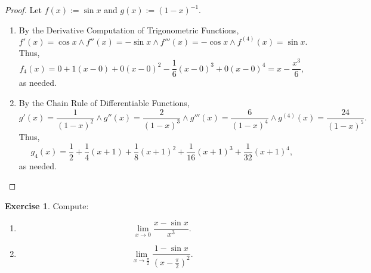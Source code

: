 \documentclass[12pt]{article}
\theoremstyle{definition}
\newtheorem{exercise}{Exercise}
\begin{document}
\begin{proof}
    Let \(f(x) := \sin x\) and \(g(x) := (1 - x)^{-1}\).
    \begin{enumerate}[label=(\alph*)]
        \item By the Derivative Computation of Trigonometric Functions, 
        \[
            f'(x) = \cos x \land f''(x) = -\sin x \land f'''(x) = -\cos x \land f^{(4)}(x) = \sin x.
        \]
        Thus,
        \[
            f_4(x) = 0 + 1(x - 0) + 0(x - 0)^2 - \frac{1}{6}(x - 0)^3 + 0(x - 0)^4 = x - \frac{x^3}{6},
        \]
        as needed.
        \item By the Chain Rule of Differentiable Functions,
        \[
            g'(x) = \frac{1}{(1 - x)^{2}} \land g''(x) = \frac{2}{(1 - x)^{3}} \land g'''(x) = \frac{6}{(1 - x)^{4}} \land g^{(4)}(x) = \frac{24}{(1 - x)^{5}}.
        \]
        Thus,
        \[
            g_4(x) = \frac{1}{2} + \frac{1}{4}(x + 1) + \frac{1}{8}(x + 1)^2 + \frac{1}{16}(x + 1)^3 + \frac{1}{32}(x + 1)^4,
        \]
        as needed.
    \end{enumerate}
\end{proof}

\begin{exercise}
    Compute:
    \begin{enumerate}[label=(\alph*)]
        \item \[
            \lim_{x \to 0}\frac{x - \sin x}{x^3}.
        \]
        \item \[
            \lim_{x \to \frac{\pi}{2}}\frac{1 - \sin x}{(x - \frac{\pi}{2})^2}.
        \]
    \end{enumerate}
\end{exercise}
\end{document}
